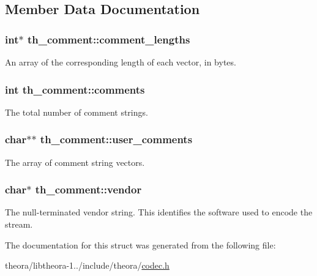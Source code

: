 \subsection{Member Data Documentation}
\hypertarget{structth__comment_a723dc6fdf75757e70e28eea864b10898}{
\subsubsection[{comment\+\_\+lengths}]{\setlength{\rightskip}{0pt plus 5cm}int$\ast$ th\+\_\+comment\+::comment\+\_\+lengths}}\label{structth__comment_a723dc6fdf75757e70e28eea864b10898}
An array of the corresponding length of each vector, in bytes. \hypertarget{structth__comment_a5990c34932376f070ad0fc314daaeb78}{
\subsubsection[{comments}]{\setlength{\rightskip}{0pt plus 5cm}int th\+\_\+comment\+::comments}}\label{structth__comment_a5990c34932376f070ad0fc314daaeb78}
The total number of comment strings. \hypertarget{structth__comment_ad72830e183e707bb0df423eb73b00de4}{
\subsubsection[{user\+\_\+comments}]{\setlength{\rightskip}{0pt plus 5cm}char$\ast$$\ast$ th\+\_\+comment\+::user\+\_\+comments}}\label{structth__comment_ad72830e183e707bb0df423eb73b00de4}
The array of comment string vectors. \hypertarget{structth__comment_a93fbe894d23603f56843be15b0cbdba0}{
\subsubsection[{vendor}]{\setlength{\rightskip}{0pt plus 5cm}char$\ast$ th\+\_\+comment\+::vendor}}\label{structth__comment_a93fbe894d23603f56843be15b0cbdba0}
The null-\/terminated vendor string. This identifies the software used to encode the stream. 

The documentation for this struct was generated from the following file\+:\begin{DoxyCompactItemize}
\item 
theora/libtheora-\/1../include/theora/\hyperlink{theora_2libtheora-1_81_81_2include_2theora_2codec_8h}{codec.\+h}\end{DoxyCompactItemize}
